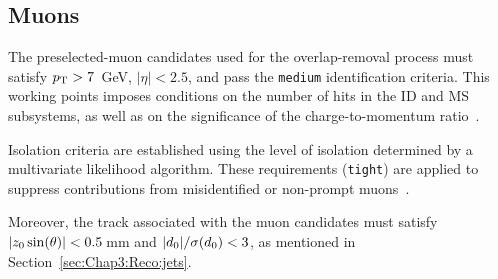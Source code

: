 \begin{comment}
In certain analysis regions, additional requirements are imposed on electrons. These include the application of 
the ``Electron Charge ID Selector Tool'' (ECIDS)~\cite{twiki-ECIDS}, which enhances the rejection of electrons 
with misidentified electrical charges. Moreover, for specific regions, cuts on the \texttt{DFCommonAddAmbiguity} 
and \texttt{ambiguityType} variables are implemented, as defined by the ``Electron Ambiguity Tool'' in 
the E/gamma derivation framework~\cite{twiki-elAmbiguity}. These cuts are designed to suppress the contribution 
from electrons originating from photon conversions by removing objects with multiple reconstructed tracks in close 
proximity to the calorimeter cluster.
It is worth noting that the requirement ``$\texttt{ambiguityType} = 0$'' in conjunction 
with ``$\texttt{DFCommonAddAmbiguity} \leq 0$'' signifies the selection of electrons with a 
veto on internal/material photon conversion candidates. In the following discussion, this will be referred 
to as the ``$e/\gamma$ ambiguity-cuts''.

\pablo{The information in subSection~\ref{sec:ChaptH:ObjectDefReco:electron} is taken from the int-note. Maybe it is too technical.}
\end{comment}

%
%
\subsection{Muons}
\label{sec:ChaptH:ObjectDefReco:muon}
The preselected-muon candidates used for the overlap-removal process must satisfy $p_{\text{T}} > 7$~GeV, $|\eta| < 2.5$, 
and pass the \texttt{medium} identification criteria. %
This working points imposes conditions on the number of hits in the ID and MS subsystems, as well as 
on the significance of the charge-to-momentum ratio~\cite{ATLAS:2016lqx, ATLAS:2020auj}. %

Isolation criteria are established using the level of isolation determined by a multivariate likelihood algorithm.
These requirements (\texttt{tight}) are applied to suppress 
contributions from misidentified or non-prompt muons~\cite{ATLAS:2022swp}. %

Moreover, the track associated with the muon candidates must satisfy %
$|z_{0} \sin(\theta)| < 0.5\,$mm and $|d_{0}| / \sigma(d_{0}) < 3$, as mentioned in Section~\ref{sec:Chap3:Reco:jets}.

